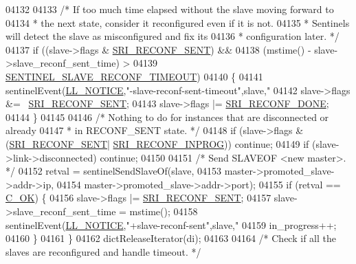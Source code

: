 \begin{DoxyCode}
{{{{{{{{{{{{{{{{{{{{{{{{{{{{{{{{{{{{{{{{{{{{{{{{{{{{{{{{{{{{{{{{{{{{{{{{{{{{{{{{{{{{{{{{{{{{{{{{{{{04132 
04133         \textcolor{comment}{/* If too much time elapsed without the slave moving forward to}
04134 \textcolor{comment}{         * the next state, consider it reconfigured even if it is not.}
04135 \textcolor{comment}{         * Sentinels will detect the slave as misconfigured and fix its}
04136 \textcolor{comment}{         * configuration later. */}
04137         \textcolor{keywordflow}{if} ((slave->flags & \hyperlink{sentinel_8c_a9b307b68cb1615ead6aacb0de34910e6}{SRI\_RECONF\_SENT}) &&
04138             (mstime() - slave->slave\_reconf\_sent\_time) >
04139             \hyperlink{sentinel_8c_a12c554c086559e7435c3d0ea9718aa39}{SENTINEL\_SLAVE\_RECONF\_TIMEOUT})
04140         \{
04141             sentinelEvent(\hyperlink{server_8h_a8c54c191e436c7dd3012167212692401}{LL\_NOTICE},\textcolor{stringliteral}{"-slave-reconf-sent-timeout"},slave,\textcolor{stringliteral}{"%
04142             slave->flags &= ~\hyperlink{sentinel_8c_a9b307b68cb1615ead6aacb0de34910e6}{SRI\_RECONF\_SENT};
04143             slave->flags |= \hyperlink{sentinel_8c_adb468d0a8c96c954b6af26aa670d7a11}{SRI\_RECONF\_DONE};
04144         \}
04145 
04146         \textcolor{comment}{/* Nothing to do for instances that are disconnected or already}
04147 \textcolor{comment}{         * in RECONF\_SENT state. */}
04148         \textcolor{keywordflow}{if} (slave->flags & (\hyperlink{sentinel_8c_a9b307b68cb1615ead6aacb0de34910e6}{SRI\_RECONF\_SENT}|
      \hyperlink{sentinel_8c_a58c89f4aaa1bdfde4c25e3bb476c35aa}{SRI\_RECONF\_INPROG})) \textcolor{keywordflow}{continue};
04149         \textcolor{keywordflow}{if} (slave->link->disconnected) \textcolor{keywordflow}{continue};
04150 
04151         \textcolor{comment}{/* Send SLAVEOF <new master>. */}
04152         retval = sentinelSendSlaveOf(slave,
04153                 master->promoted\_slave->addr->ip,
04154                 master->promoted\_slave->addr->port);
04155         \textcolor{keywordflow}{if} (retval == \hyperlink{server_8h_a303769ef1065076e68731584e758d3e1}{C\_OK}) \{
04156             slave->flags |= \hyperlink{sentinel_8c_a9b307b68cb1615ead6aacb0de34910e6}{SRI\_RECONF\_SENT};
04157             slave->slave\_reconf\_sent\_time = mstime();
04158             sentinelEvent(\hyperlink{server_8h_a8c54c191e436c7dd3012167212692401}{LL\_NOTICE},\textcolor{stringliteral}{"+slave-reconf-sent"},slave,\textcolor{stringliteral}{"%
04159             in\_progress++;
04160         \}
04161     \}
04162     dictReleaseIterator(di);
04163 
04164     \textcolor{comment}{/* Check if all the slaves are reconfigured and handle timeout. */}
}}}}}}}}}}}}}}}}}}}}}}}}}}}}}}}}}}}}}}}}}}}}}}}}}}}}}}}}}}}}}}}}}}}}}}}}}}}}}}}}}}}}}}}}}}}}}}}}}}}}}
\end{DoxyCode}
